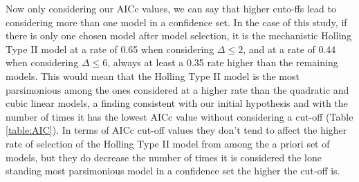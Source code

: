 \documentclass[11pt]{article}
\begin{document}
  Now only considering our AICc values, we can say that higher cuto-ffs lead to considering more than one model in a confidence set. In the case of this study, if there is only one chosen model after model selection, it is the mechanistic Holling Type II model at a rate of 0.65 when considering $\Delta\leq2$, and at a rate of 0.44 when considering $\Delta\leq6$, always at least a 0.35 rate higher than the remaining models. This would mean that the Holling Type II model is the most parsimonious among the ones considered at a higher rate than the quadratic and cubic linear models, a finding consistent with our initial hypothesis and with the number of times it has the lowest AICc value without considering a cut-off (Table \ref{table:AIC}). In terms of AICc cut-off values they don't tend to affect the higher rate of selection of the Holling Type II model from among the a priori set of models, but they do decrease the number of times it is considered the lone standing most parsimonious model in a confidence set the higher the cut-off is.

  
  
\end{document}
